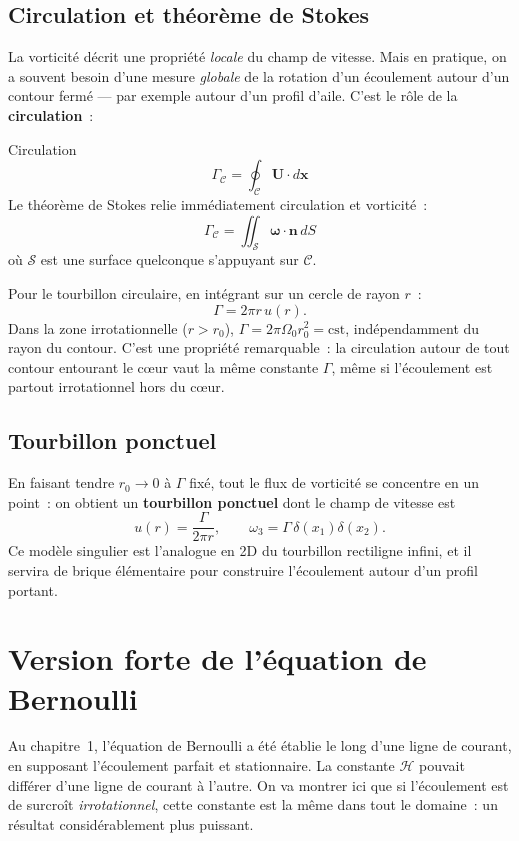 \documentclass[11pt,a4paper]{report}
\begin{document}
\subsection{Circulation et th\'eor\`eme de Stokes}

La vorticit\'e d\'ecrit une propri\'et\'e \emph{locale} du champ de vitesse. Mais en
pratique, on a souvent besoin d'une mesure \emph{globale} de la rotation d'un \'ecoulement
autour d'un contour ferm\'e --- par exemple autour d'un profil d'aile. C'est le r\^ole
de la \textbf{circulation}~:

\begin{defbox}{Circulation}
\[
  \Gamma_{\mathcal{C}} = \oint_{\mathcal{C}} \bm{U} \cdot d\bm{x}
\]
Le th\'eor\`eme de Stokes relie imm\'ediatement circulation et vorticit\'e~:
\[
  \Gamma_{\mathcal{C}} = \iint_{\mathcal{S}} \boldsymbol{\omega} \cdot \bm{n}\, dS
\]
o\`u $\mathcal{S}$ est une surface quelconque s'appuyant sur $\mathcal{C}$.
\end{defbox}

Pour le tourbillon circulaire, en int\'egrant sur un cercle de rayon $r$~:
\[
  \Gamma = 2\pi r\, u(r).
\]
Dans la zone irrotationnelle ($r > r_0$), $\Gamma = 2\pi\Omega_0 r_0^2 = \text{cst}$,
ind\'ependamment du rayon du contour. C'est une propri\'et\'e remarquable~: la circulation
autour de tout contour entourant le c\oe ur vaut la m\^eme constante $\Gamma$, m\^eme si
l'\'ecoulement est partout irrotationnel hors du c\oe ur.

\subsection{Tourbillon ponctuel}

En faisant tendre $r_0 \to 0$ \`a $\Gamma$ fix\'e, tout le flux de vorticit\'e se concentre en
un point~: on obtient un \textbf{tourbillon ponctuel} dont le champ de vitesse est
\[
  u(r) = \frac{\Gamma}{2\pi r}, \qquad
  \omega_3 = \Gamma\,\delta(x_1)\delta(x_2).
\]
Ce mod\`ele singulier est l'analogue en 2D du tourbillon rectiligne infini, et il servira de
brique \'el\'ementaire pour construire l'\'ecoulement autour d'un profil portant.

\section{Version forte de l'\'equation de Bernoulli}

Au chapitre~1, l'\'equation de Bernoulli a \'et\'e \'etablie le long d'une ligne de courant,
en supposant l'\'ecoulement parfait et stationnaire. La constante $\mathcal{H}$ pouvait
diff\'erer d'une ligne de courant \`a l'autre. On va montrer ici que si l'\'ecoulement est
de surcro\^it \emph{irrotationnel}, cette constante est la m\^eme dans tout le domaine~:
un r\'esultat consid\'erablement plus puissant.
\end{document}
